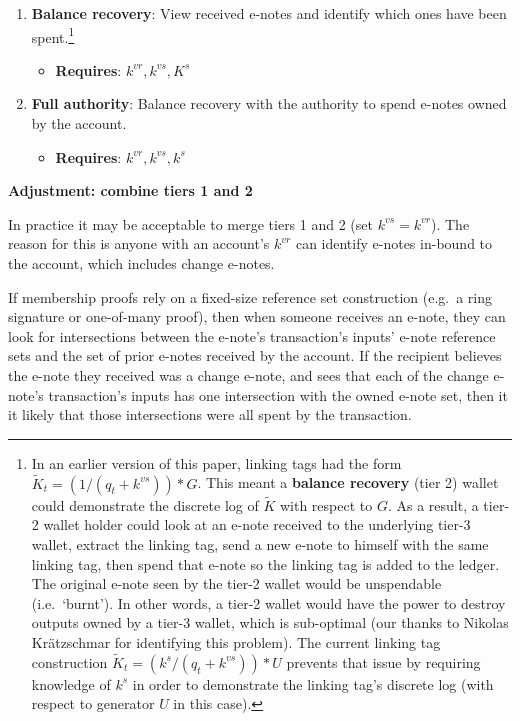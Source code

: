 \begin{itemize}
\begin{enumerate}
        \item \textbf{Balance recovery}: View received e-notes and identify which ones have been spent.\footnote{In an earlier version of this paper, linking tags had the form $\tilde{K}_t = (1/(q_t + k^{vs}))*G$. This meant a \textbf{balance recovery} (tier 2) wallet could demonstrate the discrete log of $\tilde{K}$ with respect to $G$. As a result, a tier-2 wallet holder could look at an e-note received to the underlying tier-3 wallet, extract the linking tag, send a new e-note to himself with the same linking tag, then spend that e-note so the linking tag is added to the ledger. The original e-note seen by the tier-2 wallet would be unspendable (i.e.\ `burnt'). In other words, a tier-2 wallet would have the power to destroy outputs owned by a tier-3 wallet, which is sub-optimal (our thanks to Nikolas Kr{\"{a}}tzschmar for identifying this problem). The current linking tag construction $\tilde{K}_t = (k^s/(q_t + k^{vs}))*U$ prevents that issue by requiring knowledge of $k^s$ in order to demonstrate the linking tag's discrete log (with respect to generator $U$ in this case).}
        \begin{itemize}
            \item \textbf{Requires}: $k^{vr}, k^{vs}, K^s$
        \end{itemize}

        \item \textbf{Full authority}: Balance recovery with the authority to spend e-notes owned by the account.
        \begin{itemize}
            \item \textbf{Requires}: $k^{vr}, k^{vs}, k^s$
        \end{itemize}
    \end{enumerate}
\end{itemize}

\textbf{Adjustment: combine tiers 1 and 2}

In practice it may be acceptable to merge tiers 1 and 2 (set $k^{vs} = k^{vr}$). The reason for this is anyone with an account's $k^{vr}$ can identify e-notes in-bound to the account, which includes change e-notes.

If membership proofs rely on a fixed-size reference set construction (e.g.\ a ring signature or one-of-many proof), then when someone receives an e-note, they can look for intersections between the e-note's transaction's inputs' e-note reference sets and the set of prior e-notes received by the account. If the recipient believes the e-note they received was a change e-note, and sees that each of the change e-note's transaction's inputs has one intersection with the owned e-note set, then it it likely that those intersections were all spent by the transaction.

